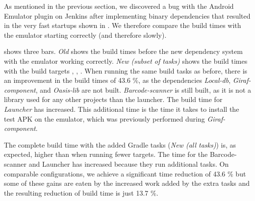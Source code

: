 As mentioned in the previous section, we discovered a bug with the Android Emulator plugin on Jenkins after implementing binary dependencies that resulted in the very fast startups shown in . We therefore compare the build times with the emulator starting correctly (and therefore slowly).

 shows three bars. \emph{Old} shows the build times before the new dependency system with the emulator working correctly. \emph{New (subset of tasks)} shows the build times with the build targets , , . When running the same build tasks as before, there is an improvement in the build times of 43.6 \%, as the dependencies \emph{Local-db}, \emph{Giraf-component}, and \emph{Oasis-lib} are not built. \emph{Barcode-scanner} is still built, as it is not a library used for any other projects than the launcher. The build time for \emph{Launcher} has increased. This additional time is the time it takes to install the test APK on the emulator, which was previously performed during \emph{Giraf-component}.

The complete build time with the added Gradle tasks (\emph{New (all tasks)}) is, as expected, higher than when running fewer targets. The time for the Barcode-scanner and Launcher has increased because they run additional tasks. On comparable configurations, we achieve a significant time reduction of 43.6 \% but some of these gains are eaten by the increased work added by the extra tasks and the resulting reduction of build time is just 13.7 \%.

